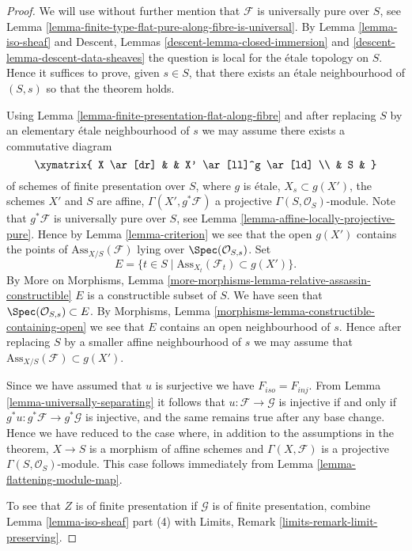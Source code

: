 \begin{proof}
We will use without further mention that $\mathcal{F}$ is universally pure
over $S$, see
Lemma \ref{lemma-finite-type-flat-pure-along-fibre-is-universal}.
By
Lemma \ref{lemma-iso-sheaf}
and
Descent, Lemmas \ref{descent-lemma-closed-immersion} and
\ref{descent-lemma-descent-data-sheaves}
the question is local for the \'etale topology on $S$.
Hence it suffices to prove, given $s \in S$, that there exists
an \'etale neighbourhood of $(S, s)$ so that the theorem holds.

\medskip\noindent
Using
Lemma \ref{lemma-finite-presentation-flat-along-fibre}
and after replacing $S$ by an elementary \'etale neighbourhood of $s$
we may assume there exists a commutative diagram
$$
\xymatrix{
X \ar[dr] & & X' \ar[ll]^g \ar[ld] \\
& S &
}
$$
of schemes of finite presentation over $S$,
where $g$ is \'etale, $X_s \subset g(X')$, the schemes $X'$ and $S$ are affine,
$\Gamma(X', g^*\mathcal{F})$ a projective $\Gamma(S, \mathcal{O}_S)$-module.
Note that $g^*\mathcal{F}$ is universally pure over $S$, see
Lemma \ref{lemma-affine-locally-projective-pure}.
Hence by
Lemma \ref{lemma-criterion}
we see that the open $g(X')$ contains the points of
$\text{Ass}_{X/S}(\mathcal{F})$ lying over $\Spec(\mathcal{O}_{S, s})$.
Set
$$
E = \{t \in S \mid \text{Ass}_{X_t}(\mathcal{F}_t) \subset g(X') \}.
$$
By
More on Morphisms,
Lemma \ref{more-morphisms-lemma-relative-assassin-constructible}
$E$ is a constructible subset of $S$. We have seen that
$\Spec(\mathcal{O}_{S, s}) \subset E$. By
Morphisms, Lemma \ref{morphisms-lemma-constructible-containing-open}
we see that $E$ contains an open neighbourhood of $s$. Hence after
replacing $S$ by a smaller affine neighbourhood of $s$ we may assume that
$\text{Ass}_{X/S}(\mathcal{F}) \subset g(X')$.

\medskip\noindent
Since we have assumed that $u$ is surjective we have $F_{iso} = F_{inj}$. From
Lemma \ref{lemma-universally-separating}
it follows that $u : \mathcal{F} \to \mathcal{G}$ is injective if and only if
$g^*u : g^*\mathcal{F} \to g^*\mathcal{G}$ is injective, and the same remains
true after any base change. Hence we have reduced to the case where,
in addition to the assumptions in the theorem, $X \to S$ is a morphism of
affine schemes and $\Gamma(X, \mathcal{F})$ is a projective
$\Gamma(S, \mathcal{O}_S)$-module. This case follows immediately from
Lemma \ref{lemma-flattening-module-map}.

\medskip\noindent
To see that $Z$ is of finite presentation if $\mathcal{G}$ is of finite
presentation, combine
Lemma \ref{lemma-iso-sheaf} part (4)
with
Limits, Remark \ref{limits-remark-limit-preserving}.
\end{proof}

